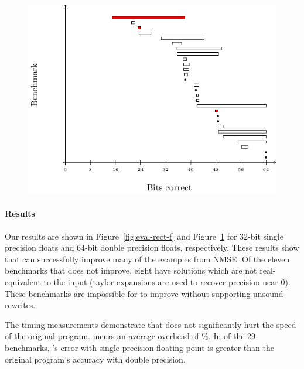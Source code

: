 \documentclass[paper.tex]{subfiles}
\begin{document}
\begin{figure}
\label{fig:eval-rect-d}
\includegraphics[width=0.9\columnwidth]{fig/eval-rect-d.pdf}
\caption{}
\end{figure}

\paragraph{Results}
Our results are shown in Figure~\ref{fig:eval-rect-f} and
Figure~\ref{fig:eval-rect-d} for 32-bit single precision floats and
64-bit double precision floats, respectively.  These results show that
\casio can successfully improve many of the examples from NMSE.  Of
the eleven benchmarks that \casio does not improve, eight have
solutions which are not real-equivalent to the input (taylor
expansions are used to recover precision near 0).  These benchmarks
are impossible for \casio to improve without supporting unsound
rewrites.

The timing measurements demonstrate that \casio does not significantly
hurt the speed of the original program.  \casio incurs an average
overhead of \%.  In  of the 29 benchmarks, \casio's
error with single precision floating point is greater than the
original program's accuracy with double precision.
\end{document}

